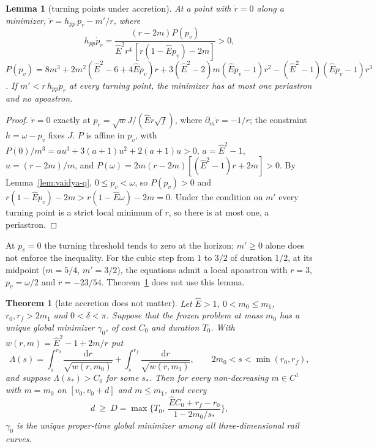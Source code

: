 \documentclass[aip,jmp,amsmath,amssymb,reprint]{revtex4-2}
\newcommand{\Ehat}{\hat E}
\newcommand{\dd}{\mathrm{d}}
\theoremstyle{plain}
\newtheorem{theorem}{Theorem}
\newtheorem{lemma}[proposition]{Lemma}
\theoremstyle{definition}
\begin{document}
\begin{lemma}[turning points under accretion]\label{lem:vaidya-turn}
At a point with $\dot r=0$ along a minimizer, $\ddot r=h_{pp}\,\dot p_r-m'/r$, where
\[
  h_{pp}\dot p_r=\frac{(r-2m)P(p_v)}{\Ehat^2r^4\,[r(1-\Ehat p_v)-2m]}>0,
\]
$P(p_v)=8m^3+2m^2(\Ehat^2-6+4\Ehat p_v)r+3(\Ehat^2-2)m(\Ehat p_v-1)r^2-(\Ehat^2-1)(\Ehat p_v-1)r^3$. If
$m'<r\,h_{pp}\dot p_r$ at every turning point, the minimizer has at most one periastron and no apoastron.
\end{lemma}

\begin{proof}
$\dot r=0$ exactly at $p_r=\sqrt wJ/(\Ehat r\sqrt f)$, where $\partial_m\dot r=-1/r$; the constraint $h=\omega-p_v$
fixes $J$. $P$ is affine in $p_v$, with $P(0)/m^3=au^3+3(a+1)u^2+2(a+1)u>0$, $a=\Ehat^2-1$, $u=(r-2m)/m$, and
$P(\omega)=2m(r-2m)[(\Ehat^2-1)r+2m]>0$. By Lemma~\ref{lem:vaidya-q}, $0\le p_v<\omega$, so $P(p_v)>0$ and
$r(1-\Ehat p_v)-2m>r(1-\Ehat\omega)-2m=0$. Under the condition on $m'$ every turning point is a strict local
minimum of $r$, so there is at most one, a periastron.
\end{proof}

At $p_v=0$ the turning threshold tends to zero at the horizon; $m'\ge0$ alone does not enforce the
inequality. For the cubic step from $1$ to $3/2$ of duration $1/2$, at its midpoint ($m=5/4$, $m'=3/2$), the
equations admit a local apoastron with $r=3$, $p_v=\omega/2$ and $\ddot r=-23/54$. Theorem~\ref{thm:vaidya-late} does not use this lemma.

\begin{theorem}[late accretion does not matter]\label{thm:vaidya-late}
Let $\Ehat>1$, $0<m_0\le m_1$, $r_0,r_f>2m_1$ and $0<\delta<\pi$. Suppose that the frozen problem at mass $m_0$
has a unique global minimizer $\gamma_0$, of cost $C_0$ and duration $T_0$. With $w(r,m)=\Ehat^2-1+2m/r$ put
\[
  \Lambda(s)=\int_s^{r_0}\frac{\dd r}{\sqrt{w(r,m_0)}}+\int_s^{r_f}\frac{\dd r}{\sqrt{w(r,m_1)}},\qquad
  2m_0<s<\min(r_0,r_f),
\]
and suppose $\Lambda(s_*)>C_0$ for some $s_*$. Then for every non-decreasing $m\in C^1$ with $m=m_0$ on
$[v_0,v_0+d]$ and $m\le m_1$, and every
\[
  d\ \ge\ D=\max\Big\{T_0,\ \frac{\Ehat C_0+r_f-r_0}{1-2m_0/s_*}\Big\},
\]
$\gamma_0$ is the unique proper-time global minimizer among all three-dimensional rail curves.
\end{theorem}
\end{document}
